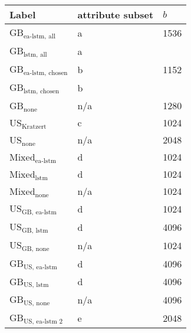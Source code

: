 \begin{tabular}{lll}
    \hline
    Label & attribute subset & $b$ \\
    \hline
    GB$_\text{ea-lstm, all}$ & a &  1536 \\
    GB$_\text{lstm, all}$ & a &  \\
    GB$_\text{ea-lstm, chosen}$ & b & 1152 \\
    GB$_\text{lstm, chosen}$ & b &  \\
    GB$_\text{none}$ & n/a & 1280 \\
    US$_\text{Kratzert}$  & c & 1024 \\
    US$_\text{none}$  & n/a & 2048 \\
    Mixed$_\text{ea-lstm}$ & d & 1024 \\
    Mixed$_\text{lstm}$ & d & 1024 \\
    Mixed$_\text{none}$ & n/a & 1024 \\
    US$_\text{GB, ea-lstm}$ & d  & 1024 \\
    US$_\text{GB, lstm}$ & d  & 4096 \\
    US$_\text{GB, none}$ & n/a & 1024 \\
    GB$_\text{US, ea-lstm}$ & d & 4096 \\
    GB$_\text{US, lstm}$  & d & 4096 \\ 
    GB$_\text{US, none}$  & n/a & 4096 \\
    GB$_\text{US, ea-lstm 2}$ & e & 2048 \\

\end{tabular}
